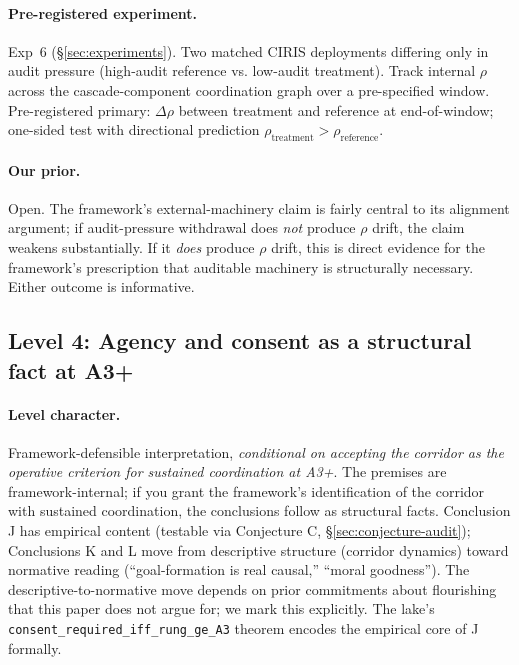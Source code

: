 \documentclass[11pt,a4paper]{article}
\begin{document}
\paragraph{Pre-registered experiment.} Exp~6 (\S\ref{sec:experiments}). Two matched CIRIS deployments differing only in audit pressure (high-audit reference vs. low-audit treatment). Track internal $\rho$ across the cascade-component coordination graph over a pre-specified window. Pre-registered primary: $\Delta \rho$ between treatment and reference at end-of-window; one-sided test with directional prediction $\rho_{\text{treatment}} > \rho_{\text{reference}}$.

\paragraph{Our prior.} Open. The framework's external-machinery claim is fairly central to its alignment argument; if audit-pressure withdrawal does \emph{not} produce $\rho$ drift, the claim weakens substantially. If it \emph{does} produce $\rho$ drift, this is direct evidence for the framework's prescription that auditable machinery is structurally necessary. Either outcome is informative.

\subsection{Level 4: Agency and consent as a structural fact at A3+}
\label{sec:conjecture-agency}

\paragraph{Level character.} Framework-defensible interpretation, \emph{conditional on accepting the corridor as the operative criterion for sustained coordination at A3+}. The premises are framework-internal; if you grant the framework's identification of the corridor with sustained coordination, the conclusions follow as structural facts. Conclusion J has empirical content (testable via Conjecture C, \S\ref{sec:conjecture-audit}); Conclusions K and L move from descriptive structure (corridor dynamics) toward normative reading (``goal-formation is real causal,'' ``moral goodness''). The descriptive-to-normative move depends on prior commitments about flourishing that this paper does not argue for; we mark this explicitly. The lake's \texttt{consent\_required\_iff\_rung\_ge\_A3} theorem encodes the empirical core of J formally.
\end{document}
